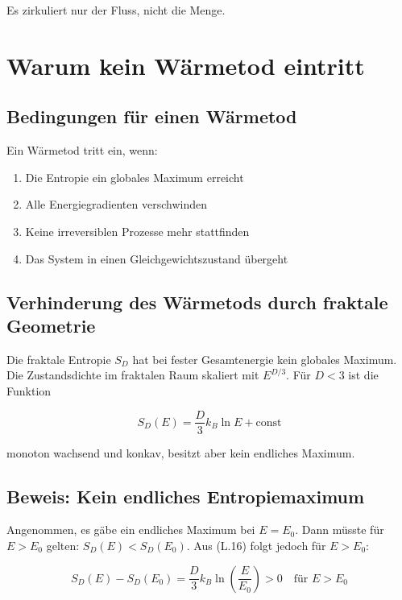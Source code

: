 Es zirkuliert nur der Fluss, nicht die Menge.

\section{Warum kein Wärmetod eintritt}
\label{app:fraktale_entropie_waermetod}

\subsection{Bedingungen für einen Wärmetod}
\label{sub:fraktale_entropie_waermetod_bedingungen}

Ein Wärmetod tritt ein, wenn:
\begin{enumerate}
    \item Die Entropie ein globales Maximum erreicht
    \item Alle Energiegradienten verschwinden
    \item Keine irreversiblen Prozesse mehr stattfinden
    \item Das System in einen Gleichgewichtszustand übergeht
\end{enumerate}

\subsection{Verhinderung des Wärmetods durch fraktale Geometrie}
\label{sub:fraktale_entropie_verhinderung}

Die fraktale Entropie \( S_D \) hat bei fester Gesamtenergie kein globales Maximum. Die Zustandsdichte im fraktalen Raum skaliert mit \( E^{D/3} \). Für \( D < 3 \) ist die Funktion

\[
S_D(E) = \frac{D}{3}k_B \ln E + \text{const} \tag{L.16}
\]

monoton wachsend und konkav, besitzt aber kein endliches Maximum.

\subsection{Beweis: Kein endliches Entropiemaximum}
\label{sub:fraktale_entropie_beweis}

Angenommen, es gäbe ein endliches Maximum bei \( E = E_0 \). Dann müsste für \( E > E_0 \) gelten: \( S_D(E) < S_D(E_0) \). Aus (L.16) folgt jedoch für \( E > E_0 \):

\[
S_D(E) - S_D(E_0) = \frac{D}{3}k_B \ln \left( \frac{E}{E_0} \right) > 0 \quad \text{für } E > E_0 \tag{L.17}
\]

